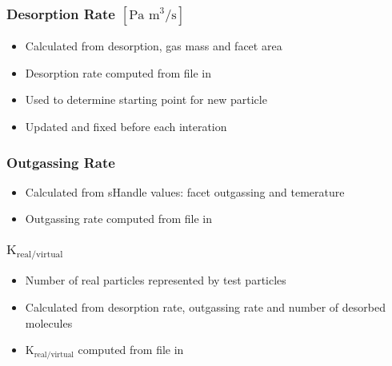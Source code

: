 \subsubsection{Desorption Rate $[\text{Pa m}^3/\text{s}]$}
\begin{itemize}[noitemsep,topsep=0pt]
\item Calculated from desorption, gas mass and facet area
\item Desorption rate computed from  file in 
\item Used to determine starting point for new particle
\item Updated and fixed before each interation
\end{itemize}

\subsubsection{Outgassing Rate}
\begin{itemize}[noitemsep,topsep=0pt]
\item Calculated from sHandle values: facet outgassing and temerature
\item Outgassing rate computed from  file in 
\end{itemize}

\subsubsection{$\text{K}_{\text{real}/\text{virtual}}$}
\begin{itemize}[noitemsep,topsep=0pt]
\item Number of real particles represented by test particles
\item Calculated from desorption rate, outgassing rate and number of desorbed molecules
\item $\text{K}_{\text{real}/\text{virtual}}$ computed from  file in 
\end{itemize}

